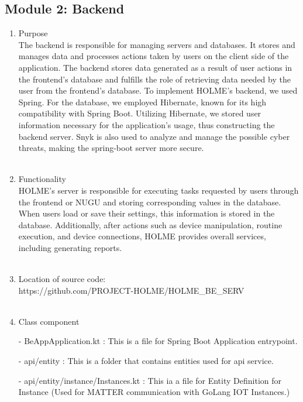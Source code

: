 \documentclass[conference]{IEEEtran}
\begin{document}
\subsection{Module 2: Backend}
\begin{enumerate}
    \item Purpose\\
    The backend is responsible for managing servers and databases. It stores and manages data and processes actions taken by users on the client side of the application. The backend stores data generated as a result of user actions in the frontend's database and fulfills the role of retrieving data needed by the user from the frontend's database. To implement HOLME's backend, we used Spring. For the database, we employed Hibernate, known for its high compatibility with Spring Boot. Utilizing Hibernate, we stored user information necessary for the application's usage, thus constructing the backend server. Snyk is also used to analyze and manage the possible cyber threats, making the spring-boot server more secure. \\ \\
    \item Functionality\\
HOLME's server is responsible for executing tasks requested by users through the frontend or NUGU and storing corresponding values in the database. When users load or save their settings, this information is stored in the database. Additionally, after actions such as device manipulation, routine execution, and device connections, HOLME provides overall services, including generating reports.\\\\
    \item Location of source code:\\ https://github.com/PROJECT-HOLME/HOLME\_BE\_SERV \\ \\
    \item Class component
        \item[-] BeAppApplication.kt : This is a file for Spring Boot Application entrypoint.\\
        \item[-] api/entity : This is a folder that contains entities used for api service.\\
        \item[-] api/entity/instance/Instances.kt : This ia a file for Entity Definition for Instance (Used for MATTER communication with
GoLang IOT Instances.)

\end{enumerate}
\end{document}
